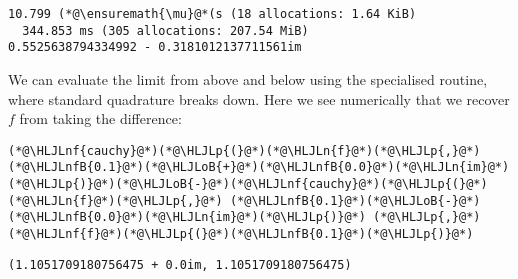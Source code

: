 \documentclass[12pt,landscape]{article}
\newcommand{\HLJLn}[1]{#1}
\newcommand{\HLJLnf}[1]{\textcolor[RGB]{66,102,213}{#1}}
\newcommand{\HLJLnfB}[1]{\textcolor[RGB]{59,151,46}{#1}}
\newcommand{\HLJLoB}[1]{\textcolor[RGB]{102,102,102}{\textbf{#1}}}
\newcommand{\HLJLp}[1]{#1}
\begin{document}
{\begin{lstlisting}
10.799 (*@\ensuremath{\mu}@*(s (18 allocations: 1.64 KiB)
  344.853 ms (305 allocations: 207.54 MiB)
0.5525638794334992 - 0.3181012137711561im
\end{lstlisting}


We can evaluate the limit from above and below using the specialised routine, where standard quadrature breaks down. Here we see numerically that we recover $f$ from taking the difference:


\begin{lstlisting}
(*@\HLJLnf{cauchy}@*)(*@\HLJLp{(}@*)(*@\HLJLn{f}@*)(*@\HLJLp{,}@*) (*@\HLJLnfB{0.1}@*)(*@\HLJLoB{+}@*)(*@\HLJLnfB{0.0}@*)(*@\HLJLn{im}@*)(*@\HLJLp{)}@*)(*@\HLJLoB{-}@*)(*@\HLJLnf{cauchy}@*)(*@\HLJLp{(}@*)(*@\HLJLn{f}@*)(*@\HLJLp{,}@*) (*@\HLJLnfB{0.1}@*)(*@\HLJLoB{-}@*)(*@\HLJLnfB{0.0}@*)(*@\HLJLn{im}@*)(*@\HLJLp{)}@*) (*@\HLJLp{,}@*) (*@\HLJLnf{f}@*)(*@\HLJLp{(}@*)(*@\HLJLnfB{0.1}@*)(*@\HLJLp{)}@*)
\end{lstlisting}

\begin{lstlisting}
(1.1051709180756475 + 0.0im, 1.1051709180756475)
\end{lstlisting}


}
\end{document}
